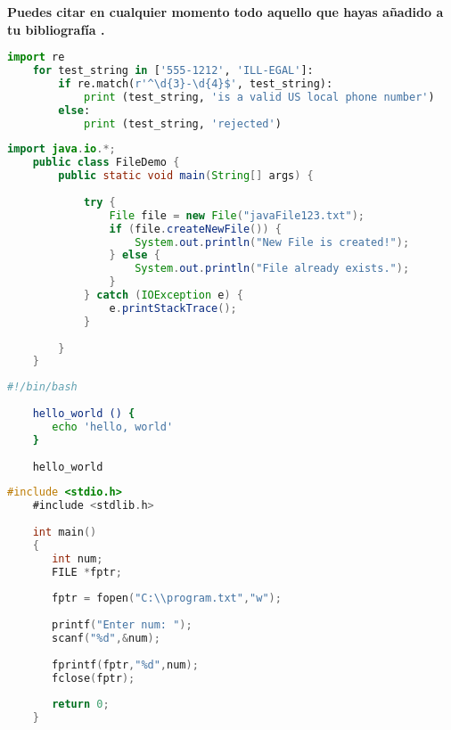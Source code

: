 \textbf{Puedes citar en cualquier momento todo aquello que hayas añadido a tu bibliografía \cite{ref-1}.}

\pagebreak

\begin{lstlisting}[language=Python]
    import re
    for test_string in ['555-1212', 'ILL-EGAL']:
        if re.match(r'^\d{3}-\d{4}$', test_string):
            print (test_string, 'is a valid US local phone number')
        else:
            print (test_string, 'rejected')
\end{lstlisting}

\begin{lstlisting}[language=Java]
    import java.io.*;  
    public class FileDemo {  
        public static void main(String[] args) {  
      
            try {  
                File file = new File("javaFile123.txt");  
                if (file.createNewFile()) {  
                    System.out.println("New File is created!");  
                } else {  
                    System.out.println("File already exists.");  
                }  
            } catch (IOException e) {  
                e.printStackTrace();  
            }  
      
        }  
    }  
\end{lstlisting}

\begin{lstlisting}[language=Bash]
    #!/bin/bash
    
    hello_world () {
       echo 'hello, world'
    }
    
    hello_world
\end{lstlisting}

\begin{lstlisting}[language=C]
    #include <stdio.h>
    #include <stdlib.h>
    
    int main()
    {
       int num;
       FILE *fptr;
    
       fptr = fopen("C:\\program.txt","w");
    
       printf("Enter num: ");
       scanf("%d",&num);
    
       fprintf(fptr,"%d",num);
       fclose(fptr);
    
       return 0;
    }
\end{lstlisting}